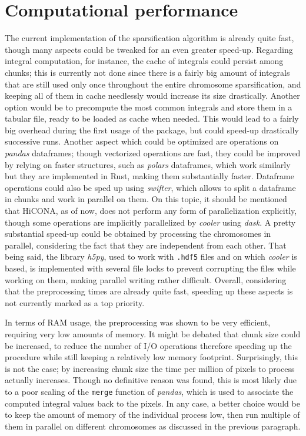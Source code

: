 \section{Computational performance}

The current implementation of the sparsification algorithm is already quite fast, though many aspects could be tweaked for an even greater speed-up. Regarding integral computation, for instance, the cache of integrals could persist among chunks; this is currently not done since there is a fairly big amount of integrals that are still used only once throughout the entire chromosome sparsification, and keeping all of them in cache needlessly would increase its size drastically. Another option would be to precompute the most common integrals and store them in a tabular file, ready to be loaded as cache when needed. This would lead to a fairly big overhead during the first usage of the package, but could speed-up drastically successive runs. Another aspect which could be optimized are operations on \textit{pandas} dataframes; though vectorized operations are fast, they could be improved by relying on faster structures, such as \textit{polars}\cite{polars2023} dataframes, which work similarly but they are implemented in Rust, making them substantially faster. Dataframe operations could also be sped up using \textit{swifter}\cite{swifter2023}, which allows to split a dataframe in chunks and work in parallel on them. On this topic, it should be mentioned that HiCONA, as of now, does not perform any form of parallelization explicitly, though some operations are implicitly parallelized by \textit{cooler} using \textit{dask}\cite{dask2023}. A pretty substantial speed-up could be obtained by processing the chromosomes in parallel, considering the fact that they are independent from each other. That being said, the library \textit{h5py}\cite{h5py2023}, used to work with \texttt{.hdf5} files and on which \textit{cooler} is based, is implemented with several file locks to prevent corrupting the files while working on them, making parallel writing rather difficult. Overall, considering that the preprocessing times are already quite fast, speeding up these aspects is not currently marked as a top priority.

In terms of RAM usage, the preprocessing was shown to be very efficient, requiring very low amounts of memory. It might be debated that chunk size could be increased, to reduce the number of I/O operations therefore speeding up the procedure while still keeping a relatively low memory footprint. Surprisingly, this is not the case; by increasing chunk size the time per million of pixels to process actually increases. Though no definitive reason was found, this is most likely due to a poor scaling of the \texttt{merge} function of \textit{pandas}, which is used to associate the computed integral values back to the pixels. In any case, a better choice would be to keep the amount of memory of the individual process low, then run multiple of them in parallel on different chromosomes as discussed in the previous paragraph. 

